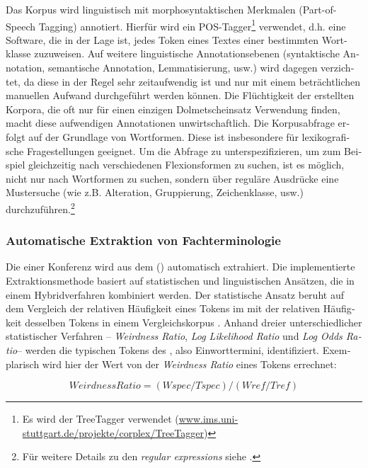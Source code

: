 \documentclass[output=paper]{LSP/langsci}
\begin{document}
\begin{otherlanguage}{ngerman}
Das Korpus wird linguistisch mit morphosyntaktischen Merkmalen (Part-of-Speech Tagging) annotiert.
Hierfür wird ein POS-Tagger\footnote{Es wird der TreeTagger verwendet (\url{www.ims.uni-stuttgart.de/projekte/corplex/TreeTagger})} verwendet, d.h. eine Software, die in der Lage ist, jedes Token eines Textes einer bestimmten Wortklasse zuzuweisen. Auf weitere linguistische Annotationsebenen (syntaktische Annotation, semantische Annotation, Lemmatisierung, usw.) wird dagegen verzichtet, da diese in der Regel sehr zeitaufwendig ist und nur mit einem beträchtlichen manuellen Aufwand durchgeführt werden können. Die Flüchtigkeit der erstellten Korpora, die oft nur für einen einzigen Dolmetscheinsatz Verwendung finden, macht diese aufwendigen Annotationen unwirtschaftlich. Die Korpusabfrage erfolgt auf der Grundlage von Wortformen. Diese ist insbesondere für lexikografische Fragestellungen geeignet. Um die Abfrage zu unterspezifizieren, um zum Beispiel gleichzeitig nach verschiedenen Flexionsformen zu suchen, ist es möglich, nicht nur nach Wortformen zu suchen, sondern über reguläre Ausdrücke eine Mustersuche (wie z.B. Alteration, Gruppierung, Zeichenklasse, usw.) durchzuführen.\footnote{Für weitere Details zu den \textit{regular expressions} siehe \citet{Friedl2006}.}

\subsubsection{Automatische Extraktion von Fachterminologie}\label{sec:fantinuoli:6.1.2}

Die  einer Konferenz wird aus dem  () automatisch extrahiert. Die implementierte Extraktionsmethode basiert auf statistischen und linguistischen Ansätzen, die in einem Hybridverfahren kombiniert werden. Der statistische Ansatz beruht auf dem Vergleich der relativen Häufigkeit eines Tokens im  mit der relativen Häufigkeit desselben Tokens in einem Vergleichskorpus \citep{Rayson2000}. Anhand dreier unterschiedlicher statistischer Verfahren -- \textit{Weirdness Ratio}, \textit{Log Likelihood Ratio} und \textit{Log Odds Ratio}-- werden die typischen Tokens des , also Einworttermini, identifiziert. Exemplarisch wird hier der Wert von der \textit{Weirdness Ratio} eines Tokens errechnet:

$$
\mathit{Weirdness}\mathit{Ratio}=(\mathit{Wspec}/\mathit{Tspec})/(\mathit{Wref}/\mathit{Tref})
$$


\end{otherlanguage}
\end{document}
